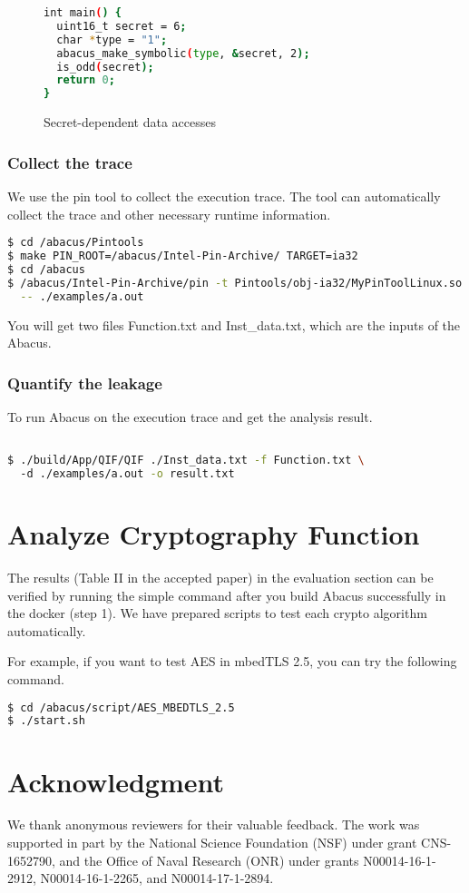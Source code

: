 \documentclass[10pt,conference]{IEEEtran}
\begin{document}
\begin{figure}[tbp]

\begin{lstlisting}[frame=single, numbers = none, language=bash]
int main() {
  uint16_t secret = 6;
  char *type = "1";
  abacus_make_symbolic(type, &secret, 2); 
  is_odd(secret);
  return 0;
}
\end{lstlisting}
\caption{Secret-dependent data accesses}
\label{fig:secret:da}
\end{figure}

\subsubsection{Collect the trace}
We use the pin tool to collect the execution trace. The tool can automatically 
collect the trace and other necessary runtime information.
\begin{lstlisting}[language=bash]
$ cd /abacus/Pintools
$ make PIN_ROOT=/abacus/Intel-Pin-Archive/ TARGET=ia32
$ cd /abacus
$ /abacus/Intel-Pin-Archive/pin -t Pintools/obj-ia32/MyPinToolLinux.so \
  -- ./examples/a.out 
\end{lstlisting}

You will get two files Function.txt and Inst\_data.txt, which are 
the inputs of the Abacus.

\subsubsection{Quantify the leakage}
To run Abacus on the execution trace and get the analysis result.
\begin{lstlisting}[language=bash]

$ ./build/App/QIF/QIF ./Inst_data.txt -f Function.txt \ 
  -d ./examples/a.out -o result.txt
\end{lstlisting}


\section{Analyze Cryptography Function}
The results (Table II in the accepted paper) in the evaluation section can be 
verified by running the simple command after you build Abacus successfully in 
the docker (step 1). We have prepared scripts to test each crypto algorithm 
automatically.

For example, if you want to test AES in mbedTLS 2.5, you can try the 
following command.

\begin{lstlisting}[language=bash]
$ cd /abacus/script/AES_MBEDTLS_2.5
$ ./start.sh
\end{lstlisting}
\section*{Acknowledgment}
We thank anonymous reviewers for their valuable feedback. The work was supported in part by the National Science Foundation (NSF) under grant CNS-1652790, and the Office of Naval Research (ONR) under grants N00014-16-1-2912, N00014-16-1-2265, and N00014-17-1-2894. 





\end{document}
